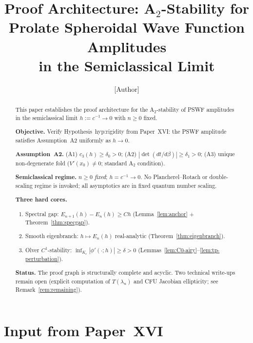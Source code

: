 \documentclass[12pt,a4paper]{amsart}
\theoremstyle{definition}
\theoremstyle{remark}
\begin{document}
\title[A$_2$-Stability for PSWF Amplitudes]{%
  Proof Architecture: A$_2$-Stability for Prolate Spheroidal Wave Function Amplitudes\\
  in the Semiclassical Limit}

\author{[Author]}

\begin{abstract}
This paper establishes the proof architecture for the A$_2$-stability
of PSWF amplitudes in the semiclassical limit $h:=c^{-1}\to 0$
with $n\ge 0$ fixed.

\medskip
\noindent\textbf{Objective.}
Verify Hypothesis~\textup{hyp:rigidity} from Paper~XVI:
the PSWF amplitude satisfies Assumption~A2 uniformly as $h\to 0$.

\medskip
\noindent\textbf{Assumption~A2.}
(A1) $c_3(h)\ge\delta_0>0$;
(A2) $|\det(dt/d\beta)|\ge\delta_1>0$;
(A3) unique non-degenerate fold ($V'(x_0)\ne 0$; standard A$_2$ condition).

\medskip
\noindent\textbf{Semiclassical regime.}
$n\ge 0$ \emph{fixed}; $h=c^{-1}\to 0$.
No Plancherel--Rotach or double-scaling regime is invoked;
all asymptotics are in fixed quantum number scaling.

\medskip
\noindent\textbf{Three hard cores.}
\begin{enumerate}[\rm(C1)]
\item Spectral gap: $E_{n+1}(h)-E_n(h)\ge Ch$
  (Lemma~\ref{lem:anchor} + Theorem~\ref{thm:specgap}).
\item Smooth eigenbranch: $h\mapsto E_n(h)$ real-analytic
  (Theorem~\ref{thm:eigenbranch}).
\item Olver $C^1$-stability: $\inf_{K_\varepsilon}|\phi'(\cdot;h)|\ge\delta>0$
  (Lemmas~\ref{lem:C0-airy}--\ref{lem:tp-perturbation}).
\end{enumerate}

\medskip
\noindent\textbf{Status.}
The proof graph is structurally complete and acyclic.
Two technical write-ups remain open
(explicit computation of $T(\lambda_n)$ and
CFU Jacobian ellipticity; see Remark~\ref{rem:remaining}).
\end{abstract}

\maketitle
\tableofcontents

\section{Input from Paper~XVI}
\label{sec:input}
\end{document}
